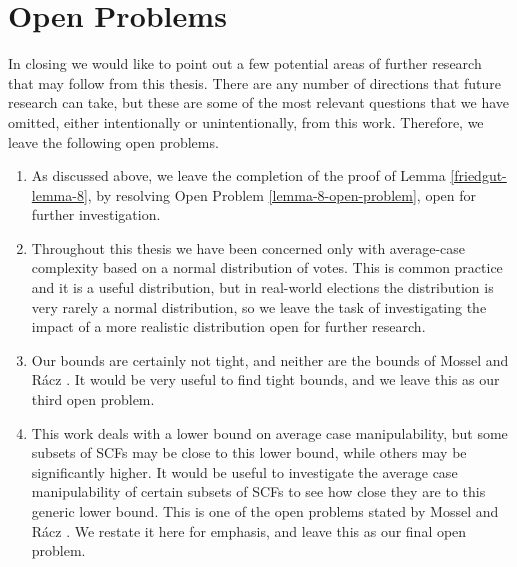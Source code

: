 \section{Open Problems}
	In closing we would like to point out a few potential areas of further research that may follow from this thesis. There are any number of directions that future research can take, but these are some of the most relevant questions that we have omitted, either intentionally or unintentionally, from this work. Therefore, we leave the following open problems.

	\begin{enumerate}
		\item As discussed above, we leave the completion of the proof of Lemma \ref{friedgut-lemma-8}, by resolving Open Problem \ref{lemma-8-open-problem}, open for further investigation.
		\item Throughout this thesis we have been concerned only with average-case complexity based on a normal distribution of votes. This is common practice and it is a useful distribution, but in real-world elections the distribution is very rarely a normal distribution, so we leave the task of investigating the impact of a more realistic distribution open for further research.
		\item Our bounds are certainly not tight, and neither are the bounds of Mossel and R\'{a}cz \cite{mossel2011quantitative}. It would be very useful to find tight bounds, and we leave this as our third open problem.
		\item This work deals with a lower bound on average case manipulability, but some subsets of SCFs may be close to this lower bound, while others may be significantly higher. It would be useful to investigate the average case manipulability of certain subsets of SCFs to see how close they are to this generic lower bound. This is one of the open problems stated by Mossel and R\'{a}cz \cite{mossel2011quantitative}. We restate it here for emphasis, and leave this as our final open problem.
	\end{enumerate}
